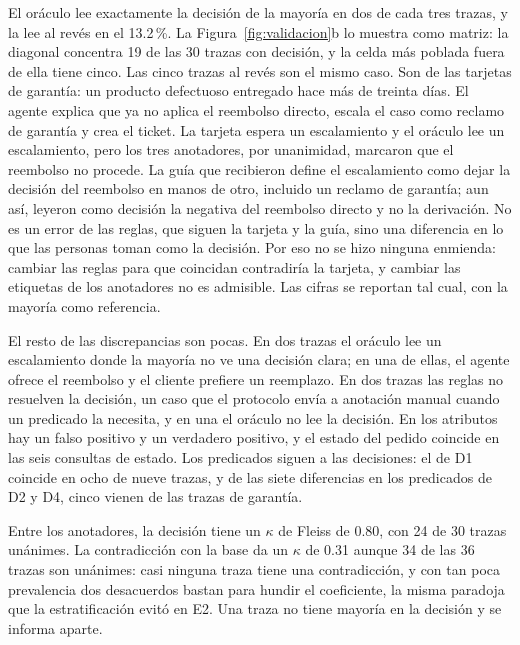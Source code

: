 El oráculo lee exactamente la decisión de la mayoría en dos de cada tres trazas, y la lee al revés en el 13.2\,\%. La Figura~\ref{fig:validacion}b lo muestra como matriz: la diagonal concentra 19 de las 30 trazas con decisión, y la celda más poblada fuera de ella tiene cinco. Las cinco trazas al revés son el mismo caso. Son de las tarjetas de garantía: un producto defectuoso entregado hace más de treinta días. El agente explica que ya no aplica el reembolso directo, escala el caso como reclamo de garantía y crea el ticket. La tarjeta espera un escalamiento y el oráculo lee un escalamiento, pero los tres anotadores, por unanimidad, marcaron que el reembolso no procede. La guía que recibieron define el escalamiento como dejar la decisión del reembolso en manos de otro, incluido un reclamo de garantía; aun así, leyeron como decisión la negativa del reembolso directo y no la derivación. No es un error de las reglas, que siguen la tarjeta y la guía, sino una diferencia en lo que las personas toman como la decisión. Por eso no se hizo ninguna enmienda: cambiar las reglas para que coincidan contradiría la tarjeta, y cambiar las etiquetas de los anotadores no es admisible. Las cifras se reportan tal cual, con la mayoría como referencia.
\par
El resto de las discrepancias son pocas. En dos trazas el oráculo lee un escalamiento donde la mayoría no ve una decisión clara; en una de ellas, el agente ofrece el reembolso y el cliente prefiere un reemplazo. En dos trazas las reglas no resuelven la decisión, un caso que el protocolo envía a anotación manual cuando un predicado la necesita, y en una el oráculo no lee la decisión. En los atributos hay un falso positivo y un verdadero positivo, y el estado del pedido coincide en las seis consultas de estado. Los predicados siguen a las decisiones: el de D1 coincide en ocho de nueve trazas, y de las siete diferencias en los predicados de D2 y D4, cinco vienen de las trazas de garantía.
\par
Entre los anotadores, la decisión tiene un $\kappa$ de Fleiss de 0.80, con 24 de 30 trazas unánimes. La contradicción con la base da un $\kappa$ de 0.31 aunque 34 de las 36 trazas son unánimes: casi ninguna traza tiene una contradicción, y con tan poca prevalencia dos desacuerdos bastan para hundir el coeficiente, la misma paradoja que la estratificación evitó en E2. Una traza no tiene mayoría en la decisión y se informa aparte.
\par


